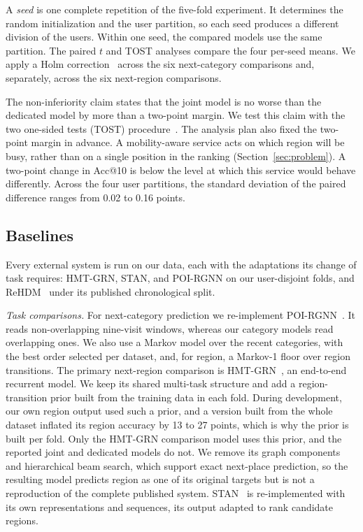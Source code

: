 A \emph{seed} is one complete repetition of the five-fold experiment. It determines the random initialization and the user partition, so each seed produces a different division of the users. Within one seed, the compared models use the same partition. The paired $t$ and TOST analyses compare the four per-seed means. We apply a Holm correction~\cite{holm1979} across the six next-category comparisons and, separately, across the six next-region comparisons.

The non-inferiority claim states that the joint model is no worse than the dedicated model by more than a two-point margin. We test this claim with the two one-sided tests (TOST) procedure~\cite{lakens2017tost}. The analysis plan also fixed the two-point margin in advance. A mobility-aware service acts on which region will be busy, rather than on a single position in the ranking (Section~\ref{sec:problem}). A two-point change in Acc@10 is below the level at which this service would behave differently. Across the four user partitions, the standard deviation of the paired difference ranges from 0.02 to 0.16 points.

\subsection{Baselines}
\label{sec:setup-baselines}
Every external system is run on our data, each with the adaptations its change of task requires:
HMT-GRN, STAN, and POI-RGNN on our user-disjoint folds, and ReHDM~\cite{li2025rehdm} under its
published chronological split.

\emph{Task comparisons.} For next-category prediction we re-implement POI-RGNN~\cite{capanema2023poirgnn}. It reads non-overlapping nine-visit windows,
whereas our category models read overlapping ones. We also use a Markov model over the recent
categories, with the best order selected per dataset, and, for region, a Markov-1 floor over region
transitions. The primary next-region comparison is
HMT-GRN~\cite{lim2022hmtgrn}, an end-to-end recurrent model. We keep its shared multi-task structure and add a region-transition prior built from the training data in
each fold. During development, our own region output used such a prior, and a version built from the whole
dataset inflated its region accuracy by 13 to 27 points, which is why the prior is built per fold.
Only the HMT-GRN comparison model uses this prior, and the reported joint and dedicated models do
not. We remove
its graph components and hierarchical beam search, which support exact next-place prediction, so
the resulting model predicts region as one of its original targets but is
not a reproduction of the complete published system. STAN~\cite{luo2021stan} is re-implemented with its own
representations and sequences, its output adapted to rank candidate regions.

